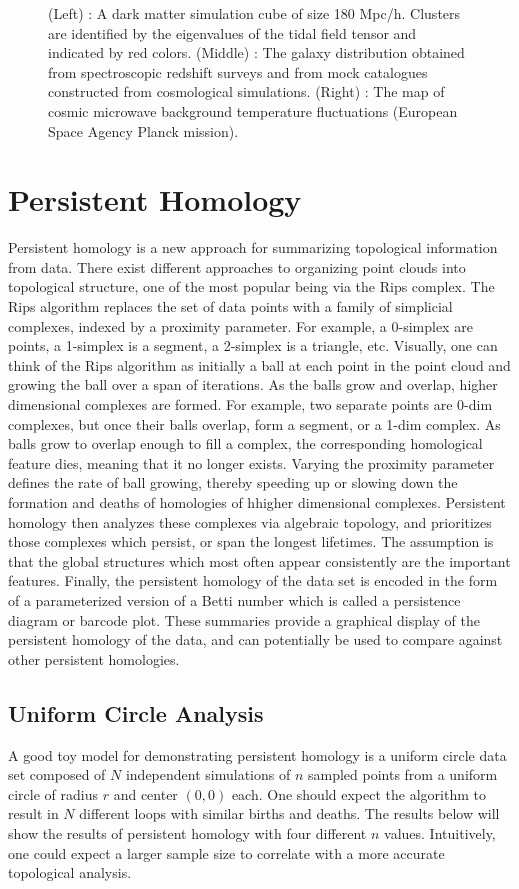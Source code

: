 \documentclass[12pt]{article}
\begin{document}
\begin{figure}[!htb]
\endminipage\hfill
\caption{(Left) : A dark matter simulation cube of size 180 Mpc/h. Clusters are identified by the eigenvalues of the tidal field tensor and indicated by red colors. (Middle) : The galaxy distribution obtained from spectroscopic redshift surveys and from mock catalogues constructed from cosmological simulations. (Right) : The map of cosmic microwave background temperature fluctuations (European Space Agency Planck mission). }
\end{figure}

\section{Persistent Homology}
Persistent homology is a new approach for summarizing topological information from data. There exist different approaches to organizing point clouds into topological structure, one of the most popular being via the Rips complex. The Rips algorithm replaces the set of data points with a family of simplicial complexes, indexed by a proximity parameter. For example, a 0-simplex are points, a 1-simplex is a segment, a 2-simplex is a triangle, etc. Visually, one can think of the Rips algorithm as initially a ball at each point in the point cloud and growing the ball over a span of iterations. As the balls grow and overlap, higher dimensional complexes are formed. For example, two separate points are 0-dim complexes, but once their balls overlap, form a segment, or a 1-dim complex. As balls grow to overlap enough to fill a complex, the corresponding homological feature dies, meaning that it no longer exists. Varying the proximity parameter defines the rate of ball growing, thereby speeding up or slowing down the formation and deaths of homologies of hhigher dimensional complexes. Persistent homology then analyzes these complexes via algebraic topology, and prioritizes those complexes which persist, or span the longest lifetimes. The assumption is that the global structures which most often appear consistently are the important features. Finally, the persistent homology of the data set is encoded in the form of a parameterized version of a Betti number which is called a persistence diagram or barcode plot. These summaries provide a graphical display of the persistent homology of the data, and can potentially be used to compare against other persistent homologies.

\subsection{Uniform Circle Analysis}
A good toy model for demonstrating persistent homology is a uniform circle data set composed of $N$ independent simulations of $n$ sampled points from a uniform circle of radius $r$ and center $(0,0)$ each. One should expect the algorithm to result in $N$ different loops with similar births and deaths. The results below will show the results of persistent homology with four different $n$ values. Intuitively, one could expect a larger sample size to correlate with a more accurate topological analysis. 
\end{document}
